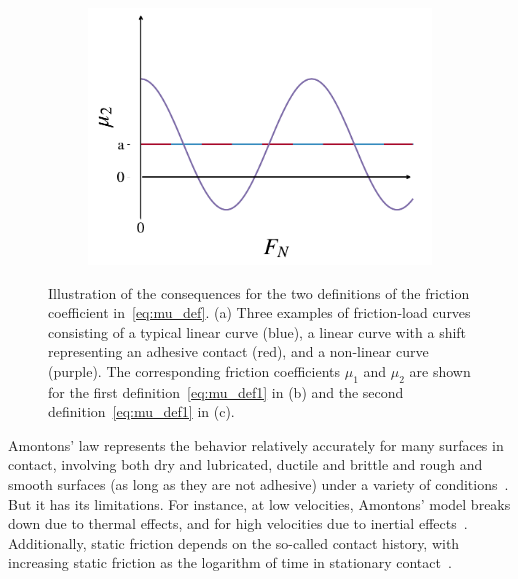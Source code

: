 \begin{figure}[H]
\begin{subfigure}[t]{0.32\textwidth}
      \caption{}
      \label{fig:fric_coef_example_b}
    \end{subfigure}
    \hfill
    \begin{subfigure}[t]{0.32\textwidth}
      \centering
      \includegraphics[width=\textwidth]{figures/theory/fric_coef_example_c.pdf}
      \caption{}
      \label{fig:fric_coef_example_c}
  \end{subfigure}
  \hfill
  \caption{Illustration of the consequences for the two definitions of the friction coefficient in~\cref{eq:mu_def}. (a) Three examples of friction-load curves consisting of a typical linear curve (blue), a linear curve with a shift representing an adhesive contact (red), and a non-linear curve (purple). The corresponding friction coefficients $\mu_1$ and $\mu_2$ are shown for the first definition~\cref{eq:mu_def1} in (b) and the second definition~\cref{eq:mu_def1} in (c).}
  \label{fig:fric_coef_example}
\end{figure}


Amontons’ law represents the behavior relatively accurately for many surfaces in contact, involving both dry and lubricated, ductile and brittle and rough and smooth surfaces (as long as they are not adhesive) under a variety of conditions~\cite{gao_frictional_2004}. But it has its limitations. For instance, at low velocities, Amontons' model breaks down due to thermal effects, and for high velocities due to inertial effects~\cite[pp.\ 5--6]{gnecco_meyer_2015}. Additionally, static friction depends on the so-called contact history, with increasing static friction as the logarithm of time in stationary contact~\cite{dieterich_1972}.

